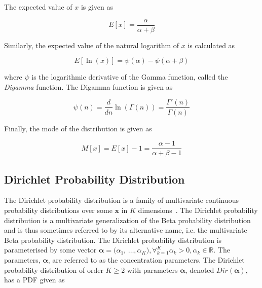 The expected value of $x$ is given as

\begin{equation}
      \label{eq:probability:probability_distributions:beta:expected_value}
      E[x] = \frac{\alpha}{\alpha + \beta}
\end{equation}

Similarly, the expected value of the natural logarithm of $x$ is calculated as

\begin{equation}
      \label{eq:probability:probability_distributions:beta:expected_value_ln}
      E[\ln(x)] = \psi({\alpha}) - \psi(\alpha + \beta)
\end{equation}

where $\psi$ is the logarithmic derivative of the Gamma function, called the \textit{Digamma} function. The Digamma function is given as

\begin{equation}
      \label{eq:probability:probability_distributions:beta:digamma}
      \psi(n) = \frac{d}{dn}\ln(\Gamma(n)) = \frac{\Gamma'(n)}{\Gamma(n)}
\end{equation}

Finally, the mode of the distribution is given as

\begin{equation}
      \label{eq:probability:probability_distributions:beta:mode}
      M[x] = E[x] - 1 = \frac{\alpha - 1}{\alpha + \beta - 1}
\end{equation}


\subsection{Dirichlet Probability Distribution}\label{sec:probability:probability_distributions:dirichlet}

The Dirichlet probability distribution is a family of multivariate continuous probability distributions over some $\boldsymbol{x}$ in $K$ dimensions~\cite{ref:wackerly:2014}. The Dirichlet probability distribution is a multivariate generalization of the Beta probability distribution and is thus sometimes referred to by its alternative name, i.e. the multivariate Beta probability distribution. The Dirichlet probability distribution is parameterised by some vector $\boldsymbol{\alpha} = (\alpha_{1}$,  $\dots, \alpha_{K}), \forall_{k=1}^{K} \alpha_{k} > 0, \alpha_{k} \in \mathbb{R}$. The parameters, $\boldsymbol{\alpha}$, are referred to as the concentration parameters. The Dirichlet probability distribution of order $K \geq 2$ with parameters $\boldsymbol{\alpha}$, denoted $Dir(\boldsymbol{\alpha})$, has a \acs{PDF} given as

